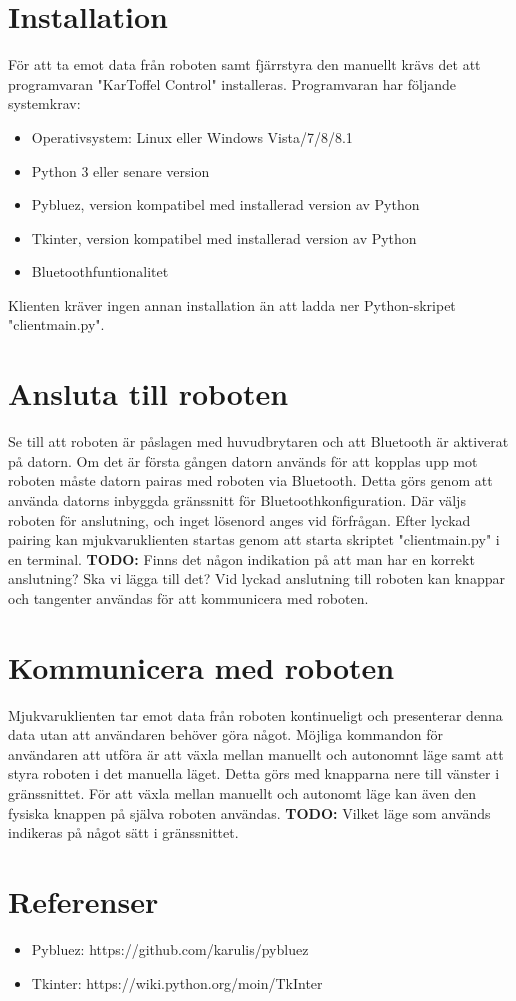 \documentclass{article}
\begin{document}
\clearpage
\section{Installation}
För att ta emot data från roboten samt fjärrstyra den manuellt krävs det att programvaran "KarToffel Control" installeras. Programvaran har följande systemkrav:
\begin{itemize}
    \item Operativsystem: Linux eller Windows Vista/7/8/8.1
    \item Python 3 eller senare version
    \item Pybluez, version kompatibel med installerad version av Python
    \item Tkinter, version kompatibel med installerad version av Python
    \item Bluetoothfuntionalitet
\end{itemize}

Klienten kräver ingen annan installation än att ladda ner Python-skripet "client\textunderscore main.py".

\clearpage
\section{Ansluta till roboten}
Se till att roboten är påslagen med huvudbrytaren och att Bluetooth är aktiverat på datorn. Om det är första gången datorn används för att kopplas upp mot roboten måste datorn pairas med roboten via Bluetooth. Detta görs genom att använda datorns inbyggda gränssnitt för Bluetoothkonfiguration. Där väljs roboten för anslutning, och inget lösenord anges vid förfrågan. Efter lyckad pairing kan mjukvaruklienten startas genom att starta skriptet "client\textunderscore main.py" i en terminal. 
\textbf{TODO:} Finns det någon indikation på att man har en korrekt anslutning? Ska vi lägga till det?
Vid lyckad anslutning till roboten kan knappar och tangenter användas för att kommunicera med roboten. 

\clearpage
\section{Kommunicera med roboten}
Mjukvaruklienten tar emot data från roboten kontinueligt och presenterar denna data utan att användaren behöver göra något.
Möjliga kommandon för användaren att utföra är att växla mellan manuellt och autonomnt läge samt att styra roboten i det manuella läget. Detta görs med knapparna nere till vänster i gränssnittet.
För att växla mellan manuellt och autonomt läge kan även den fysiska knappen på själva roboten användas. 
\textbf{TODO:} Vilket läge som används indikeras på något sätt i gränssnittet.

\clearpage
\section{Referenser}
\begin{itemize}
	\item Pybluez: https://github.com/karulis/pybluez
	\item Tkinter: https://wiki.python.org/moin/TkInter
\end{itemize}

\nocite{*}
{}

\end{document}
